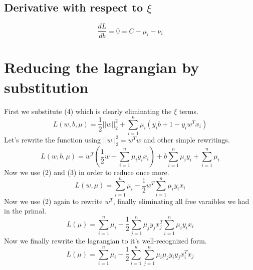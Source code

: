 \documentclass[a4paper,11pt]{article}
\begin{document}
\subsection{Derivative with respect to $\xi$}
  \begin{equation}
    \frac{dL}{db} = 0 = C - \mu_i - \nu_i
  \end{equation}

\section{Reducing the lagrangian by substitution}
First we substitute (4) which is clearly eliminating the $\xi$ terms.
\begin{equation}
  L(w, b, \mu) = \frac{1}{2} ||w||^2_2 + \sum\limits_{i=1}^n {\mu_i(y_ib + 1 - y_iw^Tx_i)}
\end{equation}
Let's rewrite the function using $ ||w||^2_2 = w^Tw $ and other simple rewritings.
\begin{equation}
  L(w, b, \mu) = w^T(\frac{1}{2}w - \sum\limits_{i=1}^n {\mu_iy_ix_i}) + b\sum\limits_{i=1}^n {\mu_iy_i} + \sum\limits_{i=1}^n {\mu_i}
\end{equation}
Now we use (2) and (3) in order to reduce once more.
\begin{equation}
  L(w, \mu) = \sum\limits_{i=1}^n {\mu_i} - \frac{1}{2} w^T \sum\limits_{i=1}^n{\mu_iy_ix_i} 
\end{equation}
Now we use (2) again to rewrite $w^T$, finally eliminating all free varaibles we had in the primal.
\begin{equation}
  L(\mu) = \sum\limits_{i=1}^n {\mu_i} - \frac{1}{2} \sum\limits_{j=1}^n{\mu_jy_jx_j^T} \sum\limits_{i=1}^n{\mu_iy_ix_i} 
\end{equation}
Now we finally rewrite the lagrangian to it's well-recognized form.
\begin{equation}
  L(\mu) = \sum\limits_{i=1}^n {\mu_i} - \frac{1}{2} \sum\limits_{i=1}^n \sum\limits_{j=1}^n{\mu_i\mu_jy_iy_jx_i^Tx_j}
\end{equation}
\end{document}
